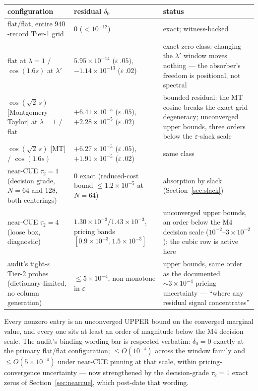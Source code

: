 \documentclass[11pt]{article}
\theoremstyle{plain}
\theoremstyle{definition}
\theoremstyle{remark}
\begin{document}
\begin{table}[h]
\centering
\small
\begin{tabular}{@{}>{\raggedright\arraybackslash}p{4.0cm}
                  >{\raggedright\arraybackslash}p{3.7cm}
                  >{\raggedright\arraybackslash}p{6.3cm}@{}}
\toprule
configuration & residual $\delta_0$ & status \\
\midrule
flat/flat, entire $940$-record Tier-1 grid & $0$ ($< 10^{-12}$) &
exact; witness-backed \\
\addlinespace
flat at $\lambda = 1$ / $\cos(1.6 s)$ at $\lambda'$ &
$5.95 \times 10^{-14}$ ($\varepsilon\ .05$),
$-1.14 \times 10^{-13}$ ($\varepsilon\ .02$) &
exact-zero class: changing the $\lambda'$ window moves nothing --- the
absorber's freedom is positional, not spectral \\
\addlinespace
$\cos(\sqrt{2}\, s)$ [Montgomery--Taylor] at $\lambda = 1$ / flat &
$+6.41 \times 10^{-5}$ ($\varepsilon\ .05$),
$+2.28 \times 10^{-5}$ ($\varepsilon\ .02$) &
bounded residual: the MT cosine breaks the exact grid degeneracy; unconverged
upper bounds, three orders below the $\varepsilon$-slack scale \\
\addlinespace
$\cos(\sqrt{2}\, s)$ [MT] / $\cos(1.6 s)$ &
$+6.27 \times 10^{-5}$ ($\varepsilon\ .05$),
$+1.91 \times 10^{-5}$ ($\varepsilon\ .02$) & same class \\
\addlinespace
near-CUE $\tau_2 = 1$ (decision grade, $N = 64$ and $128$, both centerings) &
$0$ exact (reduced-cost bound $\le 1.2 \times 10^{-5}$ at $N = 64$) &
absorption by slack (Section~\ref{sec:slack}) \\
\addlinespace
near-CUE $\tau_2 = 4$ (loose box, diagnostic) &
$1.30 \times 10^{-3} / 1.43 \times 10^{-3}$, pricing bands
$[0.9 \times 10^{-3}, 1.5 \times 10^{-3}]$ &
unconverged upper bounds, an order below the M4 decision scale
($10^{-2}$--$3 \times 10^{-2}$); the cubic row is active here \\
\addlinespace
audit's tight-$\varepsilon$ Tier-2 probes (dictionary-limited, no column
generation) & $\le 5 \times 10^{-4}$, non-monotone in $\varepsilon$ &
upper bounds, same order as the documented ${\sim}3 \times 10^{-4}$ pricing
uncertainty --- ``where any residual signal concentrates'' \\
\bottomrule
\end{tabular}
\end{table}

Every nonzero entry is an unconverged UPPER bound on the converged marginal
value, and every one sits at least an order of magnitude below the M4 decision
scale. The audit's binding wording bar is respected verbatim: $\delta_0 = 0$
exactly at the primary flat/flat configuration; $\le O(10^{-4})$ across the
window family and $\le O(5 \times 10^{-4})$ under near-CUE pinning at that scale,
within pricing-convergence uncertainty --- now strengthened by the
decision-grade $\tau_2 = 1$ exact zeros of Section~\ref{sec:nearcue}, which
post-date that wording.
\end{document}
